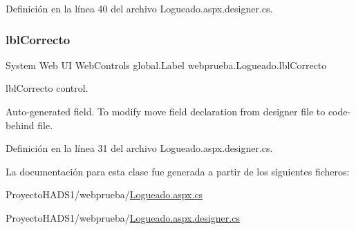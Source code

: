 Definición en la línea 40 del archivo Logueado.\+aspx.\+designer.\+cs.

\mbox{\label{classwebprueba_1_1_logueado_a6c53109d079503d4d447eb6efae76c5a}} 
\subsubsection{\texorpdfstring{lblCorrecto}{lblCorrecto}}
{\footnotesize\ttfamily System Web UI Web\+Controls global.\+Label webprueba.\+Logueado.\+lbl\+Correcto\hspace{0.3cm}{\ttfamily [protected]}}



lbl\+Correcto control. 

Auto-\/generated field. To modify move field declaration from designer file to code-\/behind file. 

Definición en la línea 31 del archivo Logueado.\+aspx.\+designer.\+cs.



La documentación para esta clase fue generada a partir de los siguientes ficheros\+:\begin{DoxyCompactItemize}
\item 
Proyecto\+H\+A\+D\+S1/webprueba/\mbox{\hyperlink{_proyecto_h_a_d_s1_2webprueba_2_logueado_8aspx_8cs}{Logueado.\+aspx.\+cs}}\item 
Proyecto\+H\+A\+D\+S1/webprueba/\mbox{\hyperlink{_proyecto_h_a_d_s1_2webprueba_2_logueado_8aspx_8designer_8cs}{Logueado.\+aspx.\+designer.\+cs}}\end{DoxyCompactItemize}
